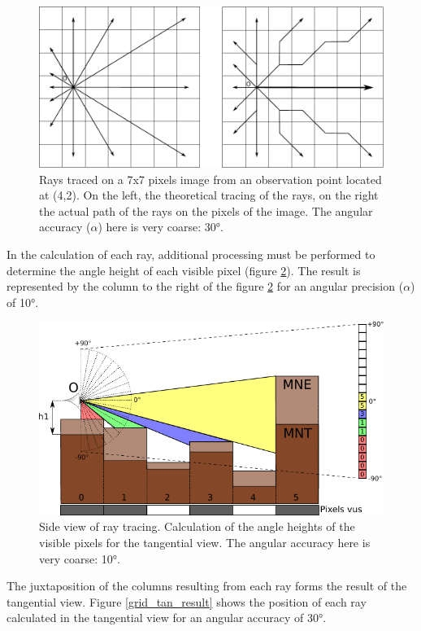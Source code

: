 \documentclass{report}
\begin{document}
\begin{figure}[H]
	\includegraphics[scale=0.8]{img/grid_tan.pdf} 
	\caption{Rays traced on a 7x7 pixels image from an observation point located at (4,2). On the left, the theoretical tracing of the rays, on the right the actual path of the rays on the pixels of the image. The angular accuracy ($\alpha$) here is very coarse: 30°.}
	\label{grid_tan}
\end{figure}

In the calculation of each ray, additional processing must be performed to determine the angle height of each visible pixel (figure \ref{ray_side_tan}). The result is represented by the column to the right of the figure \ref{ray_side_tan} for an angular precision ($\alpha$) of 10°.

\begin{figure}[H]
	\includegraphics{img/ray_side_tan-fr.pdf} 
	\caption{Side view of ray tracing. Calculation of the angle heights of the visible pixels for the tangential view. The angular accuracy here is very coarse: 10°.}
	\label{ray_side_tan}
\end{figure}

The juxtaposition of the columns resulting from each ray forms the result of the tangential view. Figure \ref{grid_tan_result} shows the position of each ray calculated in the tangential view for an angular accuracy of 30°.
\end{document}
